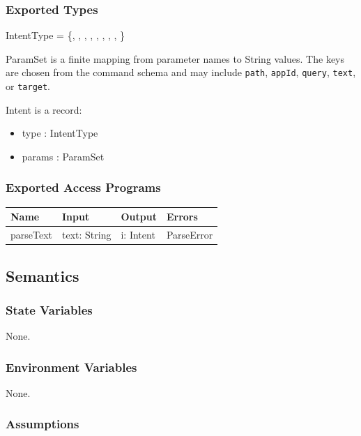 \documentclass[12pt, titlepage]{article}
\begin{document}
\subsubsection{Exported Types}

\noindent
IntentType = \{, , ,
, , ,
, , \}

\noindent
ParamSet is a finite mapping from parameter names to String values. The keys are
chosen from the command schema and may include \texttt{path}, \texttt{appId},
\texttt{query}, \texttt{text}, or \texttt{target}.

\noindent
Intent is a record:
\begin{itemize}
  \item type : IntentType
  \item params : ParamSet
\end{itemize}

\subsubsection{Exported Access Programs}

\begin{center}
\begin{tabular}{p{2.7cm} p{4cm} p{4cm} p{2.5cm}}
\hline
\textbf{Name} & \textbf{Input} & \textbf{Output} & \textbf{Errors} \\
\hline
parseText & text: String & i: Intent & ParseError \\
\hline
\end{tabular}
\end{center}

\subsection{Semantics}

\subsubsection{State Variables}

None.

\subsubsection{Environment Variables}

None.

\subsubsection{Assumptions}
\end{document}
